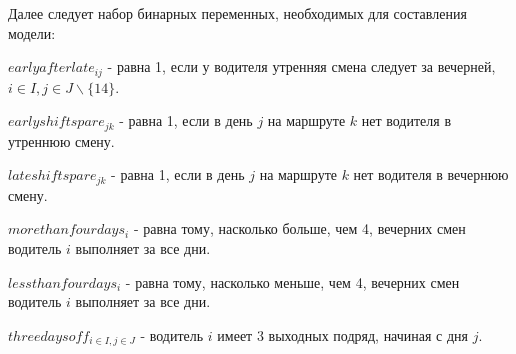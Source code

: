 \documentclass[]{article}
\begin{document}
Далее следует набор бинарных переменных, необходимых для составления модели:
\par\noindent
$earlyafterlate_{ij}$ - равна 1, если у водителя утренняя смена следует за вечерней,
$i \in I, j \in J\backslash\{14\}$.
\par\noindent
$earlyshiftspare_{jk}$ - равна 1, если в день $j$ на маршруте $k$ нет водителя в утреннюю смену.
\par\noindent
$lateshiftspare_{jk}$ - равна 1, если в день $j$ на маршруте $k$ нет водителя в вечернюю смену.
\par\noindent
$morethanfourdays_{i}$ - равна тому, насколько больше, чем 4,  вечерних смен водитель $i$ выполняет за все дни.
\par\noindent
$lessthanfourdays_{i}$ - равна тому, насколько меньше, чем 4,  вечерних смен водитель $i$ выполняет за все дни.
\par\noindent
$threedaysoff_{i \in I, j \in J}$ - водитель $i$ имеет 3 выходных подряд, начиная с дня $j$.
\par\noindent
\end{document}
